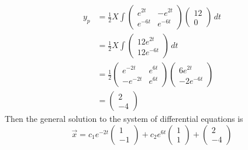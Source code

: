 \documentclass[11pt, titlepage]{article}
\begin{document}
\begin{enumerate}
\begin{solution}
\begin{align*}
                    y_p &= \frac{1}{2} X \int
                    \begin{pmatrix}
                        e^{2t} & -e^{2t} \\
                        e^{-6t} & e^{-6t} 
                    \end{pmatrix}
                    \begin{pmatrix}
                        12 \\
                        0
                    \end{pmatrix} \, dt \\
                        &= \frac{1}{2} X \int
                    \begin{pmatrix}
                        12e^{2t} \\
                        12e^{-6t}
                    \end{pmatrix} \, dt \\
                        &= \frac{1}{2}
                    \begin{pmatrix}
                        e^{-2t} & e^{6t} \\
                        -e^{-2t} & e^{6t}
                    \end{pmatrix}
                    \begin{pmatrix}
                        6e^{2t} \\
                        -2e^{-6t}
                    \end{pmatrix} \\
                        &=
                    \begin{pmatrix}
                        2 \\
                        -4
                    \end{pmatrix}
                \end{align*}
                Then the general solution to the system of differential
                equations is
                \[
                    \vec{x} = c_1 e^{-2t}
                    \begin{pmatrix}
                        1 \\
                        -1
                    \end{pmatrix} + c_2 e^{6t}
                    \begin{pmatrix}
                        1 \\
                        1
                    \end{pmatrix} +
                    \begin{pmatrix}
                        2 \\
                        -4
                    \end{pmatrix}
                \] 
            \end{solution}


\end{enumerate}
\end{document}
